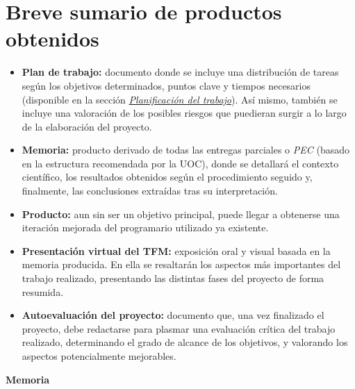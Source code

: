 \documentclass[IB,BIB]{TFUOC}%
\begin{document}
\normalsize


\section{Breve sumario de productos obtenidos}
\label{sec:PEC1 - Breve sumario de productos obtenidos}

\footnotesize

\begin{itemize}
    \item \textbf{Plan de trabajo:} documento donde se incluye una distribución de tareas según los objetivos determinados, puntos clave y tiempos necesarios (disponible en la sección \textit{\hyperref[sec:Planificación del trabajo]{Planificación del trabajo}}). Así mismo, también se incluye una valoración de los posibles riesgos que puedieran surgir a lo largo de la elaboración del proyecto.
    \item \textbf{Memoria:} producto derivado de todas las entregas parciales o \textit{PEC} (basado en la estructura recomendada por la UOC), donde se detallará el contexto científico, los resultados obtenidos según el procedimiento seguido y, finalmente, las conclusiones extraídas tras su interpretación.
    \item \textbf{Producto:} aun sin ser un objetivo principal, puede llegar a obtenerse una iteración mejorada del programario utilizado ya existente.
    \item \textbf{Presentación virtual del TFM:} exposición oral y visual basada en la memoria producida. En ella se resaltarán los aspectos más importantes del trabajo realizado, presentando las distintas fases del proyecto de forma resumida.
    \item \textbf{Autoevaluación del proyecto:} documento que, una vez finalizado el proyecto, debe redactarse para plasmar una evaluación crítica del trabajo realizado, determinando el grado de alcance de los objetivos, y valorando los aspectos potencialmente mejorables.
\end{itemize}

\normalsize


\newpage\null\thispagestyle{empty} %

\Huge
\vfill

\textbf{Memoria}
\normalsize

\newpage



\end{document}
